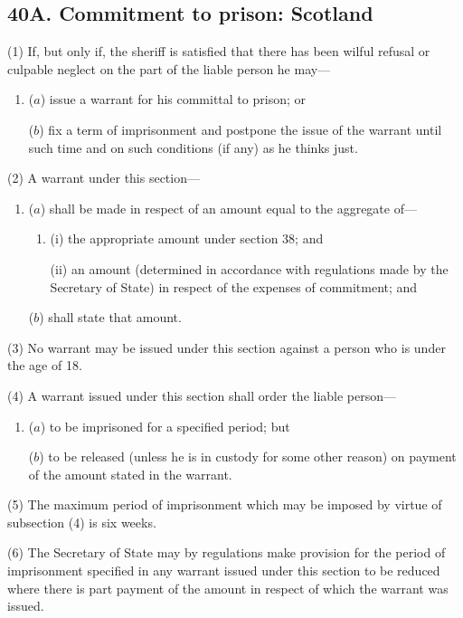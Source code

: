 \documentclass[a4paper]{article}
\begin{document}
\subsection{40A. Commitment to prison: Scotland}

(1) If, but only if, the sheriff is satisfied that there has been wilful refusal or culpable neglect on the part of the liable person he may---
\begin{enumerate}\item[]
($a$) issue a warrant for his committal to prison; or

($b$) fix a term of imprisonment and postpone the issue of the warrant until such time and on such conditions (if any) as he thinks just.
\end{enumerate}

(2) A warrant under this section---
\begin{enumerate}\item[]
($a$) shall be made in respect of an amount equal to the aggregate of---
\begin{enumerate}\item[]
(i) the appropriate amount under section 38; and

(ii) an amount (determined in accordance with regulations made by the
Secretary of State) in respect of the expenses of commitment; and
\end{enumerate}

($b$) shall state that amount.
\end{enumerate}

(3) No warrant may be issued under this section against a person who is under the
age of 18.

(4) A warrant issued under this section shall order the liable person---
\begin{enumerate}\item[]
($a$) to be imprisoned for a specified period; but

($b$) to be released (unless he is in custody for some other reason) on payment of
the amount stated in the warrant.
\end{enumerate}

(5) The maximum period of imprisonment which may be imposed by virtue of
subsection (4) is six weeks.

(6) The Secretary of State may by regulations make provision for the period of
imprisonment specified in any warrant issued under this section to be reduced where
there is part payment of the amount in respect of which the warrant was issued.
\end{document}
